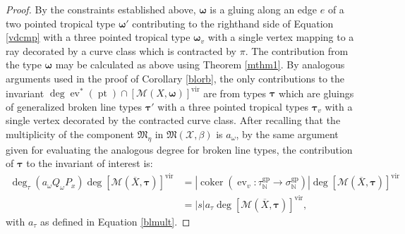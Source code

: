 \documentclass[12pt, oneside]{amsart}   	%
\newcounter{thm}
\newcommand{\NN}{\mathbb{N}}
\newcommand{\vir}{\operatorname{vir}}
\newcommand{\pt}{\operatorname{pt}}
\newcommand{\ev}{\operatorname{ev}}
\newcommand{\gp}{\operatorname{gp}}
\newcommand{\out}{\operatorname{out}}
\newcommand{\coker}{\operatorname{coker}}
\numberwithin{equation}{section}
\numberwithin{thm}{section}
\numberwithin{figure}{section}
\begin{document}
\begin{proof}

By the constraints established above, $\pmb\omega$ is a gluing along an edge $e$ of a two pointed tropical type $\pmb\omega'$ contributing to the righthand side of Equation \ref{vdcmp} with a three pointed tropical type $\pmb\omega_v$ with a single vertex mapping to a ray decorated by a curve class which is contracted by $\pi$. The contribution from the type $\pmb\omega$ may be calculated as above using Theorem \ref{mthm1}. By analogous arguments used in the proof of Corollary \ref{blorb}, the only contributions to the invariant $\deg\ev^*(\pt)\cap [\mathscr{M}(X,\pmb\omega)]^{\vir} $ are from types $\pmb\tau$ which are gluings of generalized broken line types $\pmb\tau'$ with a three pointed tropical types $\pmb\tau_v$ with a single vertex decorated by the contracted curve class. After recalling that the multiplicity of the component $\mathfrak{M}_{\eta}$ in $\mathfrak{M}(\mathcal{X},\beta)$ is $a_{\omega}$, by the same argument given for evaluating the analogous degree for broken line types, the contribution of $\pmb\tau$ to the invariant of interest is:
\begin{equation}
\begin{split}
\deg_{\tau}(a_{\omega}Q_{\omega}P_x)\deg[\mathscr{M}(\overline{X},\pmb\tau)]^{\vir} &= |\coker(\ev_v: \tau^{\gp}_{\NN} \rightarrow \sigma^{\gp}_{\NN})|\deg[\mathscr{M}(\overline{X},\pmb\tau)]^{\vir} \\
&= |s|a_{\tau}\deg[\mathscr{M}(\overline{X},\pmb\tau)]^{\vir},
\end{split}
\end{equation}
with $a_{\tau}$ as defined in Equation \ref{blmult}. 




\end{proof}
\end{document}
